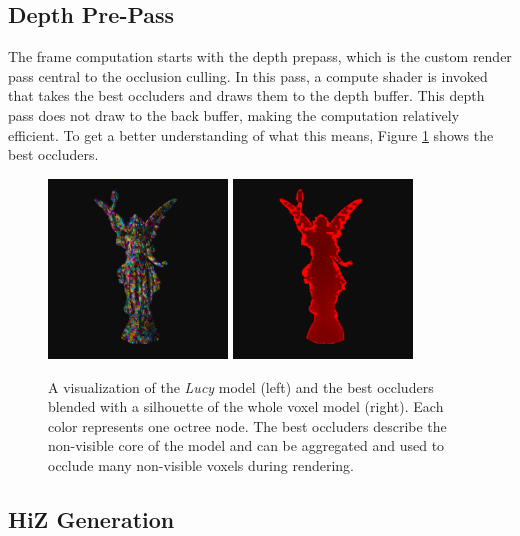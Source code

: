 \clearpage

\subsection*{Depth Pre-Pass} \label{subsec-depth-prepass}

The frame computation starts with the depth prepass, which is the custom render pass central to the 
occlusion culling. In this pass, a compute shader is invoked that takes the best occluders and draws 
them to the depth buffer. This depth pass does not draw to the back buffer, making the computation 
relatively efficient. To get a better understanding of what this means, Figure \ref{fig:best-occluder-viz} 
shows the best occluders. \\

\begin{figure}[h]
    \centering
    \includegraphics[width=180px]{images/graphics/lucy-best-occluders-viz.jpg}
    \includegraphics[width=180px]{images/graphics/lucy-best-occluders-diff-viz.jpg}
    \caption{A visualization of the \emph{Lucy} model (left) and the best occluders blended with a silhouette 
    of the whole voxel model (right). Each color represents one octree node. The best occluders describe the 
    non-visible core of the model and can be aggregated and used to occlude many non-visible voxels during 
    rendering.}
    \label{fig:best-occluder-viz}
\end{figure}
\enlargethispage{\baselineskip}
\enlargethispage{\baselineskip}

\subsection*{HiZ Generation} \label{subsec-highz-generation}

